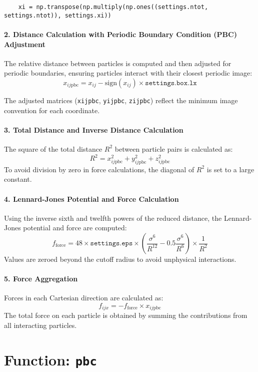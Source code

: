 \documentclass[12pt, ngerman]{report}
\begin{document}
\begin{verbatim}
	xi = np.transpose(np.multiply(np.ones((settings.ntot, settings.ntot)), settings.xi))
\end{verbatim}

\paragraph{2. Distance Calculation with Periodic Boundary Condition (PBC) Adjustment}
The relative distance between particles is computed and then adjusted for periodic boundaries, ensuring particles interact with their closest periodic image:
\[
x_{ij\text{pbc}} = x_{ij} - \text{sign}(x_{ij}) \times \texttt{settings.box.lx}
\]

The adjusted matrices (\texttt{xijpbc}, \texttt{yijpbc}, \texttt{zijpbc}) reflect the minimum image convention for each coordinate.

\paragraph{3. Total Distance and Inverse Distance Calculation}
The square of the total distance \(R^2\) between particle pairs is calculated as:
\[
R^2 = x_{ij\text{pbc}}^2 + y_{ij\text{pbc}}^2 + z_{ij\text{pbc}}^2
\]
To avoid division by zero in force calculations, the diagonal of \(R^2\) is set to a large constant.

\paragraph{4. Lennard-Jones Potential and Force Calculation}
Using the inverse sixth and twelfth powers of the reduced distance, the Lennard-Jones potential and force are computed:
\[
f_{\text{force}} = 48 \times \texttt{settings.eps} \times \left(\frac{\sigma^6}{R^{12}} - 0.5 \frac{\sigma^6}{R^6}\right) \times \frac{1}{R^2}
\]
Values are zeroed beyond the cutoff radius to avoid unphysical interactions.

\paragraph{5. Force Aggregation}
Forces in each Cartesian direction are calculated as:
\[
f_{ijx} = -f_{\text{force}} \times x_{ij\text{pbc}}
\]
The total force on each particle is obtained by summing the contributions from all interacting particles.

\section{Function: \texttt{pbc}}
\label{sec:pbc_function}
\end{document}
